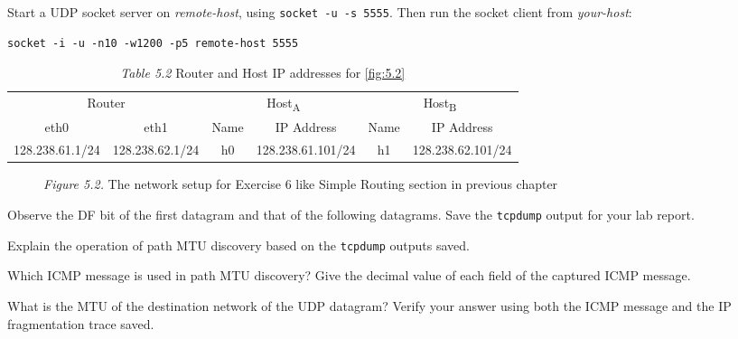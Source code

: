 \documentclass{../UTNetLab}
\begin{document}
    Start a UDP socket server on \textit{remote-host}, using \lstinline{socket -u -s 5555}.
    Then run the socket client from \textit{your-host}:
    \begin{lstlisting}[emph={your-host, remote-host}]
socket -i -u -n10 -w1200 -p5 remote-host 5555
    \end{lstlisting}

    \begin{table}[H]
        \caption{\textit{Table 5.2} Router and Host IP addresses for \autoref{fig:5.2}}
        \centering
        \begin{tabular}{ *2c|*2c|*2c }
            \hline \hline
            \multicolumn{2}{c|}{Router} & \multicolumn{2}{c|}{Host\textsubscript{A}} & \multicolumn{2}{c}{Host\textsubscript{B}} \\
            eth0 & eth1 & Name & IP Address & Name & IP Address \\
            \hline 
            128.238.61.1/24 & 128.238.62.1/24 & h0 & 128.238.61.101/24 & h1 & 128.238.62.101/24 \\
            \hline \hline
            \end{tabular}
    \end{table}

    \begin{figure}[H]
        \centering
        \caption{\textit{Figure 5.2.} The network setup for Exercise 6 like Simple Routing section in previous chapter}
        \label{fig:5.2}
    \end{figure}

    Observe the DF bit of the first datagram and that of the following datagrams. Save the \lstinline{tcpdump} output for your lab report.

    \begin{report}
    \item Explain the operation of path MTU discovery based on the \lstinline{tcpdump} outputs saved.
    
    \item Which ICMP message is used in path MTU discovery? Give the decimal value of each field of the captured ICMP message.
    
    \item What is the MTU of the destination network of the UDP datagram? Verify your answer using both the ICMP message and the IP fragmentation trace saved.
    \end{report}
\end{document}

